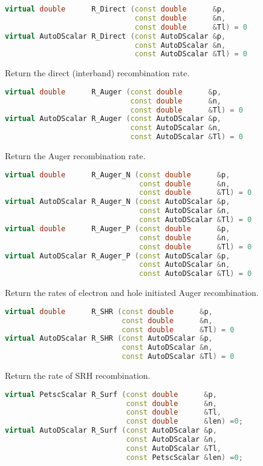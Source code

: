 \documentclass[oneside,12pt]{cgd_book}
\begin{document}
\begin{lstlisting}[language={C++}]
virtual double      R_Direct (const double      &p,
                              const double      &n,
                              const double      &Tl) = 0
virtual AutoDScalar R_Direct (const AutoDScalar &p,
                              const AutoDScalar &n,
                              const AutoDScalar &Tl) = 0
\end{lstlisting}
Return the direct (interband) recombination rate.
\par
\begin{lstlisting}[language={C++}]
virtual double      R_Auger (const double      &p,
                             const double      &n,
                             const double      &Tl) = 0
virtual AutoDScalar R_Auger (const AutoDScalar &p,
                             const AutoDScalar &n,
                             const AutoDScalar &Tl) = 0
\end{lstlisting}
Return the Auger recombination rate.
\par
\begin{lstlisting}[language={C++}]
virtual double      R_Auger_N (const double      &p,
                               const double      &n,
                               const double      &Tl) = 0
virtual AutoDScalar R_Auger_N (const AutoDScalar &p,
                               const AutoDScalar &n,
                               const AutoDScalar &Tl) = 0
virtual double      R_Auger_P (const double      &p,
                               const double      &n,
                               const double      &Tl) = 0
virtual AutoDScalar R_Auger_P (const AutoDScalar &p,
                               const AutoDScalar &n,
                               const AutoDScalar &Tl) = 0
\end{lstlisting}
Return the rates of electron and hole initiated Auger recombination.
\par
\begin{lstlisting}[language={C++}]
virtual double      R_SHR (const double      &p,
                           const double      &n,
                           const double      &Tl) = 0
virtual AutoDScalar R_SHR (const AutoDScalar &p,
                           const AutoDScalar &n,
                           const AutoDScalar &Tl) = 0
\end{lstlisting}
Return the rate of SRH recombination.
\par
\begin{lstlisting}[language={C++}]
virtual PetscScalar R_Surf (const double      &p,
                            const double      &n,
                            const double      &Tl,
                            const double      &len) =0;
virtual AutoDScalar R_Surf (const AutoDScalar &p,
                            const AutoDScalar &n,
                            const AutoDScalar &Tl,
                            const PetscScalar &len) =0;
\end{lstlisting}
\end{document}
